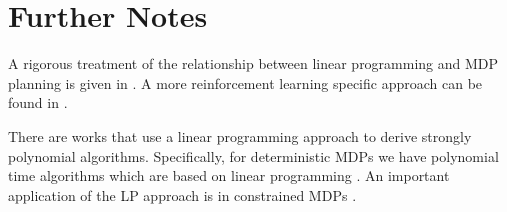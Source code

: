 
% 
% 
% 


\section{Further Notes}


A rigorous treatment of the relationship between linear programming and MDP planning is given in \cite{puterman2014markov}. A more reinforcement learning specific approach can be found in \cite{FariasR03, desai2009smoothed}.


There are works that use a linear programming approach to derive strongly polynomial algorithms. Specifically, for deterministic MDPs we have polynomial time algorithms which are based on linear programming \cite{MadaniTZ10,PostY13}. An important application of the LP approach is in constrained MDPs \cite{altman2021constrained}.